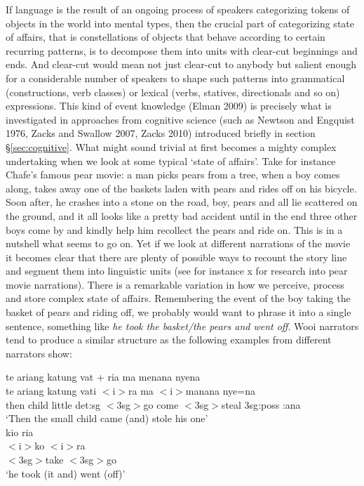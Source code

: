 If language is the result of an ongoing process of speakers categorizing tokens of objects in the world into mental types, then the crucial part of categorizing state of affairs, that is constellations of objects that behave according to certain recurring patterns, is to decompose them into units with clear-cut beginnings and ends. And clear-cut would mean not just clear-cut to anybody but salient enough for a considerable number of speakers to shape such patterns into grammatical (constructions, verb classes) or lexical (verbs, statives, directionals and so on) expressions. This kind of event knowledge (Elman 2009) is precisely what is investigated in approaches from cognitive science (such as Newtson and Engquist 1976, Zacks and Swallow 2007, Zacks 2010) introduced briefly in section §\ref{sec:cognitive}. What might sound trivial at first becomes a mighty complex undertaking when we look at some typical `state of affairs'. Take for instance Chafe's famous pear movie: a man picks pears from a tree, when a boy comes along, takes away one of the baskets laden with pears and rides off on his bicycle. Soon after, he crashes into a stone on the road, boy, pears and all lie scattered on the ground, and it all looks like a pretty bad accident until in the end three other boys come by and kindly help him recollect the pears and ride on. This is in a nutshell what seems to go on. Yet if we look at different narrations of the movie it becomes clear that there are plenty of possible ways to recount the story line and segment them into linguistic units (see for instance x for research into pear movie narrations). There is a remarkable variation in how we perceive, process and store complex state of affairs. Remembering the event of the boy taking the basket of pears and riding off, we probably would want to phrase it into a single sentence, something like \textit{he took the basket/the pears and went off}. Wooi narrators tend to produce a similar structure as the following examples from different narrators show:

\pex \label{}
\a
\gll te ariang katung vat + ria ma menana nyena \\
te ariang katung vati $<$i$>$ra ma $<$i$>$manana nye=na \\
\glc then child little \acs{det}:\acs{sg} $<$\acs{3}\acs{sg}$>$go come $<$\acs{3}\acs{sg}$>$steal \acs{3}\acs{sg}:\acs{poss} :\acs{ana}\\
\glft `Then the small child came (and) stole his one'\\
\z
\a
\gll kio ria\\
$<$i$>$ko $<$i$>$ra \\
\glc $<$\acs{3}\acs{sg}$>$take $<$\acs{3}\acs{sg}$>$go\\
\glft `he took (it and) went (off)' \ 
\z
\xe

